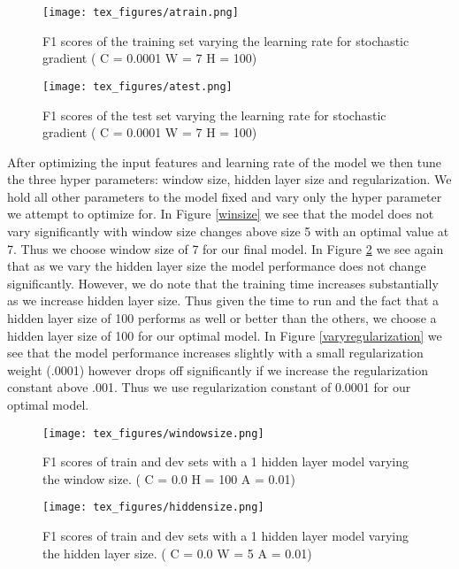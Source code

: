 \documentclass{article}
\begin{document}
\begin{figure}[ht]
\begin{minipage}[b]{0.45\linewidth}
\centering
\texttt{[image: tex\_figures/atrain.png]}
\caption{F1 scores of the training set varying the learning rate for stochastic gradient  ( C = 0.0001 W = 7 H = 100)}
\label{learntrain}
\end{minipage}
\hspace{0.5cm}
\begin{minipage}[b]{0.45\linewidth}
\centering
\texttt{[image: tex\_figures/atest.png]}
\caption{F1 scores of the test set varying the learning rate for stochastic gradient  ( C = 0.0001 W = 7 H = 100)}
\label{learndev}
\end{minipage}
\end{figure}


After optimizing the input features and learning rate of the model we then tune the three hyper parameters: window size, hidden layer size and regularization.  We hold all other parameters to the model fixed and vary only the hyper parameter we attempt to optimize for.  In Figure \ref{winsize} we see that the model does not vary significantly with window size changes above size 5 with an optimal value at 7.  Thus we choose window size of 7 for our final model.
In Figure \ref{hiddensize} we see again that as we vary the hidden layer size the model performance does not change significantly.  However, we do note that the training time increases substantially as we increase hidden layer size.  Thus given the time to run and the fact that a hidden layer size of 100 performs as well or better than the others, we choose a hidden layer size of 100 for our optimal model.
In Figure \ref{varyregularization} we see that the model performance increases slightly with a small regularization weight (.0001) however drops off significantly if we increase the regularization constant above .001.  Thus we use regularization constant of 0.0001 for our optimal model.

\begin{figure}[ht]
\begin{minipage}[b]{0.45\linewidth}
\centering
\texttt{[image: tex\_figures/windowsize.png]}
\caption{F1 scores of train and dev sets with a 1 hidden layer model varying the window size. ( C = 0.0  H = 100 A = 0.01)}
\label{winsize}
\end{minipage}
\hspace{0.5cm}
\begin{minipage}[b]{0.45\linewidth}
\centering
\texttt{[image: tex\_figures/hiddensize.png]}
\caption{F1 scores of train and dev sets with a 1 hidden layer model varying the hidden layer size. ( C = 0.0 W = 5  A = 0.01)}
\label{hiddensize}
\end{minipage}
\end{figure}
\end{document}
